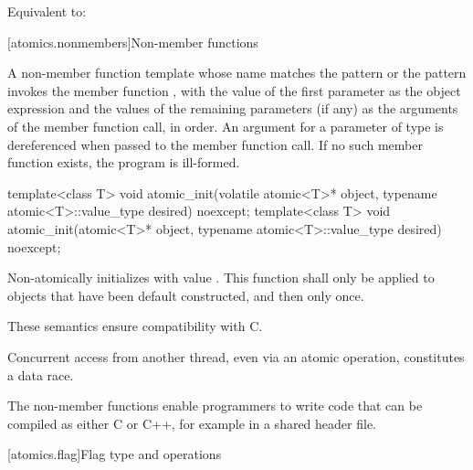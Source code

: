 \begin{itemdescr}
\pnum
\effects Equivalent to: 
\end{itemdescr}


[atomics.nonmembers]{Non-member functions}

\pnum
A non-member function template whose name matches the pattern
 or the pattern 
invokes the member function , with the value of the
first parameter as the object expression and the values of the remaining parameters
(if any) as the arguments of the member function call, in order. An argument
for a parameter of type  is dereferenced when
passed to the member function call.
If no such member function exists, the program is ill-formed.

%
\begin{itemdecl}
template<class T>
  void atomic_init(volatile atomic<T>* object, typename atomic<T>::value_type desired) noexcept;
template<class T>
  void atomic_init(atomic<T>* object, typename atomic<T>::value_type desired) noexcept;
\end{itemdecl}

\begin{itemdescr}
\pnum
\effects Non-atomically
initializes  with value . This function shall only be applied
to objects that have been default constructed, and then only once.
\begin{note}
These semantics ensure compatibility with C.
\end{note}
\begin{note}
Concurrent access from another thread, even via an atomic operation, constitutes
a data race.
\end{note}
\end{itemdescr}

\pnum
\begin{note}
The non-member functions enable programmers to write code that can be
compiled as either C or C++, for example in a shared header file.
\end{note}

[atomics.flag]{Flag type and operations}

